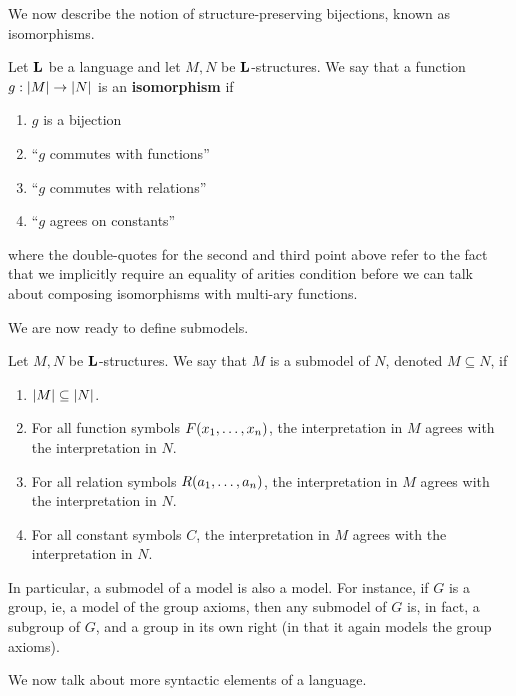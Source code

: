 We now describe the notion of structure-preserving bijections, known as isomorphisms.

\begin{boxdefinition}[Isomorphism]\label{Ch1:Def:Isomorphism}
    Let $\mathbf{L}$ be a language and let $M, N$ be $\mathbf{L}$-structures. We say that a function $g : \left\lvert M \right\rvert \to \left\lvert N \right\rvert$ is an \textbf{isomorphism} if
    \begin{enumerate}
        \item $g$ is a bijection
        \item ``$g$ commutes with functions''
        \item ``$g$ commutes with relations''
        \item ``$g$ agrees on constants''
    \end{enumerate}
    where the double-quotes for the second and third point above refer to the fact that we implicitly require an equality of arities condition before we can talk about composing isomorphisms with multi-ary functions.
\end{boxdefinition}


We are now ready to define submodels.

\begin{boxdefinition}[Submodel]
    Let $M, N$ be $\mathbf{L}$-structures. We say that $M$ is a submodel of $N$, denoted $M \subseteq N$, if
    \begin{enumerate}
        \item $\left\lvert M \right\rvert \subseteq \left\lvert N \right\rvert$.
        \item For all function symbols $F\!\left( x_1, \ldots, x_n \right)$, the interpretation in $M$ agrees with the interpretation in $N$.
        \item For all relation symbols $R\!\left( a_1, \ldots, a_n \right)$, the interpretation in $M$ agrees with the interpretation in $N$.
        \item For all constant symbols $C$, the interpretation in $M$ agrees with the interpretation in $N$.
    \end{enumerate}
\end{boxdefinition}

In particular, a submodel of a model is also a model. For instance, if $G$ is a group, ie, a model of the group axioms, then any submodel of $G$ is, in fact, a subgroup of $G$, and a group in its own right (in that it again models the group axioms).

We now talk about more syntactic elements of a language.


